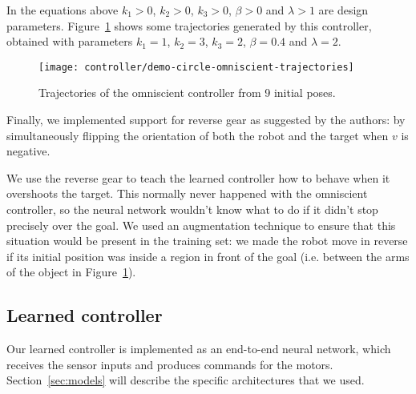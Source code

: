 In the equations above $k_1 > 0$, $k_2 > 0$, $k_3 > 0$, $\beta > 0$ and $\lambda > 1$ are design parameters. Figure~\ref{fig:omniscient-trajectories} shows some trajectories generated by this controller, obtained with parameters $k_1 = 1$, $k_2 = 3$, $k_3 = 2$, $\beta = 0.4$ and $\lambda = 2$.

\begin{figure}[htbp]
	\centerline{\texttt{[image: controller/demo-circle-omniscient-trajectories]}}
	\caption{Trajectories of the omniscient controller from 9 initial poses.}
	\label{fig:omniscient-trajectories}
\end{figure}

Finally, we implemented support for reverse gear as suggested by the authors: by simultaneously flipping the orientation of both the robot and the target when $v$ is negative. 

We use the reverse gear to teach the learned controller how to behave when it overshoots the target. This normally never happened with the omniscient controller, so the neural network wouldn't know what to do if it didn't stop precisely over the goal. We used an augmentation technique to ensure that this situation would be present in the training set: we made the robot move in reverse if its initial position was inside a region in front of the goal (i.e. between the arms of the object in Figure~\ref{fig:omniscient-trajectories}).

\subsection{Learned controller}

Our learned controller is implemented as an end-to-end neural network, which 
receives the sensor inputs and produces commands for the motors. 
Section~\ref{sec:models} will describe the specific architectures that we used.

